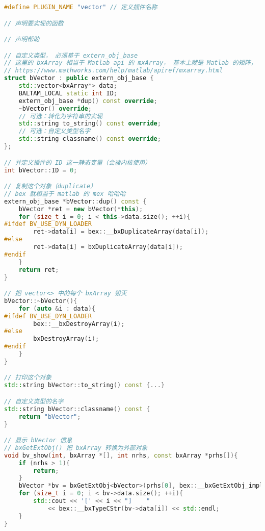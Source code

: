 \begin{lstlisting}[language=cpp,caption=vector 插件的 main.cpp]
#define PLUGIN_NAME "vector" // 定义插件名称

// 声明要实现的函数

// 声明帮助

// 自定义类型， 必须基于 extern_obj_base
// 这里的 bxArray 相当于 Matlab api 的 mxArray， 基本上就是 Matlab 的矩阵， 什么都能装．
// https://www.mathworks.com/help/matlab/apiref/mxarray.html
struct bVector : public extern_obj_base {
    std::vector<bxArray*> data;
    BALTAM_LOCAL static int ID;
    extern_obj_base *dup() const override;
    ~bVector() override;
    // 可选：转化为字符串的实现
    std::string to_string() const override;
    // 可选：自定义类型名字
    std::string classname() const override;
};

// 并定义插件的 ID 这一静态变量（会被内核使用）
int bVector::ID = 0;

// 复制这个对象（duplicate）
// bex 就相当于 matlab 的 mex 哈哈哈
extern_obj_base *bVector::dup() const {
    bVector *ret = new bVector(*this);
    for (size_t i = 0; i < this->data.size(); ++i){
#ifdef BV_USE_DYN_LOADER
        ret->data[i] = bex::__bxDuplicateArray(data[i]);
#else
        ret->data[i] = bxDuplicateArray(data[i]);
#endif
    }
    return ret;
}

// 把 vector<> 中的每个 bxArray 毁灭
bVector::~bVector(){
    for (auto &i : data){
#ifdef BV_USE_DYN_LOADER
        bex::__bxDestroyArray(i);
#else
        bxDestroyArray(i);
#endif
    }
}

// 打印这个对象
std::string bVector::to_string() const {...}

// 自定义类型的名字
std::string bVector::classname() const {
    return "bVector";
}

// 显示 bVector 信息
// bxGetExtObj() 把 bxArray 转换为外部对象
void bv_show(int, bxArray *[], int nrhs, const bxArray *prhs[]){
    if (nrhs > 1){
        return;
    }
    bVector *bv = bxGetExtObj<bVector>(prhs[0], bex::__bxGetExtObj_impl);
    for (size_t i = 0; i < bv->data.size(); ++i){
        std::cout << '[' << i << "]    "
            << bex::__bxTypeCStr(bv->data[i]) << std::endl;
    }
}
\end{lstlisting}

